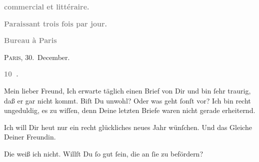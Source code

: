 \pstart
           \begin{otherlanguage}{french}\textcolor{gray}{\textbf{commercial et littéraire.}}\end{otherlanguage}\pend
           
\pstart
           \begin{otherlanguage}{french}\textcolor{gray}{\textbf{\textbf{Paraissant trois fois par jour.}}}\end{otherlanguage}\pend
           
\pstart
           \begin{otherlanguage}{french}\textcolor{gray}{\textbf{\textbf{Bureau à Paris}}}\end{otherlanguage}\hfill \textsc{Paris}, 30. December.\pend
           
\pstart
           \begin{otherlanguage}{french}\textcolor{gray}{\textbf{\textbf{10 .}}}\end{otherlanguage}\pend
           
\pstart\center{}Mein lieber Freund,\pend\vspace{0.5em}
\pstart
           Ich erwarte täglich einen Brief von Dir und bin{ }ſehr traurig, daß er gar nicht kommt.
               Biſt Du unwohl? Oder was geht{ }ſonſt vor? Ich bin recht ungeduldig, es zu wiſſen, denn
               Deine letzten Briefe waren nicht gerade erheiternd.\pend
           
\pstart
           Ich will Dir heut nur ein recht glückliches neues Jahr
               wünſchen. Und das Gleiche Deiner Freundin.\pend
           
\pstart
           Die \label{K_L02835-1v}\label{K_L02835-1} weiß ich nicht. Willſt Du{ }ſo gut{ }ſein, die \label{K_L02835-2v}\label{K_L02835-2} an{ }ſie zu befördern?\pend
           
